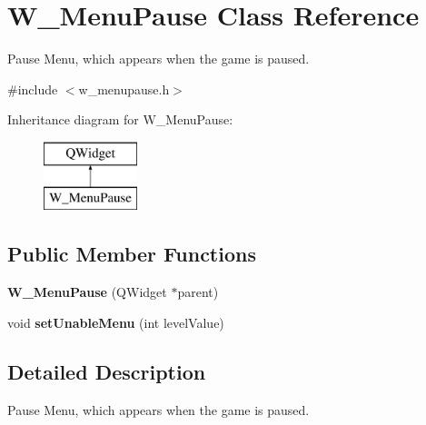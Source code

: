 \hypertarget{class_w___menu_pause}{}\section{W\+\_\+\+Menu\+Pause Class Reference}
\label{class_w___menu_pause}


Pause Menu, which appears when the game is paused.  




{\ttfamily \#include $<$w\+\_\+menupause.\+h$>$}

Inheritance diagram for W\+\_\+\+Menu\+Pause\+:\begin{figure}[H]
\begin{center}
\leavevmode
\includegraphics[height=2.000000cm]{class_w___menu_pause}
\end{center}
\end{figure}
\subsection*{Public Member Functions}
\begin{DoxyCompactItemize}
\item 
\hypertarget{class_w___menu_pause_a61d951b79b548ae4f6524310ad427e99}{}{\bfseries W\+\_\+\+Menu\+Pause} (Q\+Widget $\ast$parent)\label{class_w___menu_pause_a61d951b79b548ae4f6524310ad427e99}

\item 
\hypertarget{class_w___menu_pause_ae2c5843c3f74ea871b6fe22be99cb91b}{}void {\bfseries set\+Unable\+Menu} (int level\+Value)\label{class_w___menu_pause_ae2c5843c3f74ea871b6fe22be99cb91b}

\end{DoxyCompactItemize}


\subsection{Detailed Description}
Pause Menu, which appears when the game is paused. 

